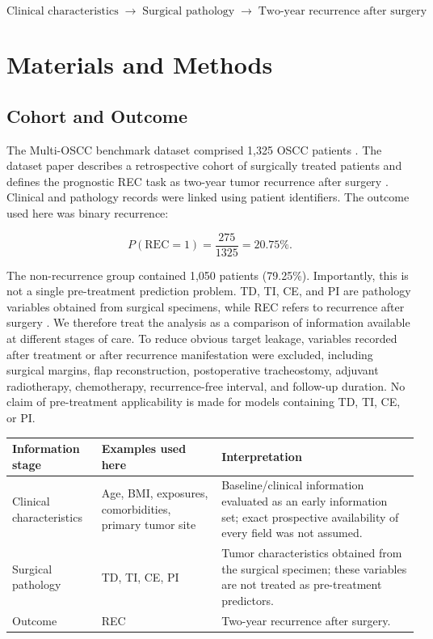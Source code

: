 \documentclass[11pt,a4paper]{article}
\begin{document}
\[
\text{Clinical characteristics} \;\longrightarrow\; \text{Surgical pathology} \;\longrightarrow\; \text{Two-year recurrence after surgery}
\]

\section{Materials and Methods}

\subsection{Cohort and Outcome}

The Multi-OSCC benchmark dataset comprised 1,325 OSCC patients \cite{guan2026multi}. The dataset paper describes a retrospective cohort of surgically treated patients and defines the prognostic REC task as two-year tumor recurrence after surgery \cite{guan2026multi}. Clinical and pathology records were linked using patient identifiers. The outcome used here was binary recurrence:

\begin{equation}
P(\mathrm{REC}=1)=\frac{275}{1325}=20.75\%.
\end{equation}

The non-recurrence group contained 1,050 patients (79.25\%). Importantly, this is not a single pre-treatment prediction problem. TD, TI, CE, and PI are pathology variables obtained from surgical specimens, while REC refers to recurrence after surgery \cite{guan2026multi}. We therefore treat the analysis as a comparison of information available at different stages of care. To reduce obvious target leakage, variables recorded after treatment or after recurrence manifestation were excluded, including surgical margins, flap reconstruction, postoperative tracheostomy, adjuvant radiotherapy, chemotherapy, recurrence-free interval, and follow-up duration. No claim of pre-treatment applicability is made for models containing TD, TI, CE, or PI.

\begin{center}
\small
\begin{tabularx}{0.96\linewidth}{@{}>{\raggedright\arraybackslash}l>{\raggedright\arraybackslash}X>{\raggedright\arraybackslash}X@{}}
\toprule
\textbf{Information stage} & \textbf{Examples used here} & \textbf{Interpretation} \\
\midrule
Clinical characteristics & Age, BMI, exposures, comorbidities, primary tumor site & Baseline/clinical information evaluated as an early information set; exact prospective availability of every field was not assumed. \\
Surgical pathology & TD, TI, CE, PI & Tumor characteristics obtained from the surgical specimen; these variables are not treated as pre-treatment predictors. \\
Outcome & REC & Two-year recurrence after surgery. \\
\bottomrule
\end{tabularx}
\end{center}
\end{document}
